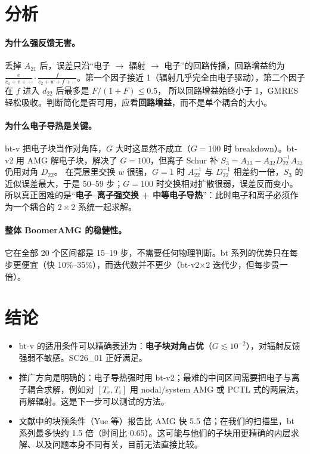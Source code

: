 \documentclass[11pt,a4paper]{ctexart}
\begin{document}
\section{分析}
\paragraph{为什么强反馈无害。}丢掉 $A_{21}$ 后，误差只沿“电子 $\to$ 辐射 $\to$ 电子”的回路传播，回路增益约为
$\frac{e}{c_1+e+\cdots}\cdot\frac{f}{c_2+w+f+\cdots}$。第一个因子接近 1（辐射几乎完全由电子驱动），第二个因子在 $f$ 进入 $d_{22}$ 后最多是 $F/(1+F)\le 0.5$，
所以回路增益始终小于 1，GMRES 轻松吸收。判断简化是否可用，应看\textbf{回路增益}，而不是单个耦合的大小。
\paragraph{为什么电子导热是关键。}bt-v 把电子块当作对角阵，$G$ 大时这显然不成立（$G=100$ 时 breakdown）。bt-v2 用 AMG 解电子块，解决了 $G=100$，但离子 Schur 补 $S_3=A_{33}-A_{32}D_{22}^{-1}A_{23}$ 仍用对角 $D_{22}$。
在壳层里交换 $w$ 很强，$G=1$ 时 $A_{22}^{-1}$ 与 $D_{22}^{-1}$ 相差约一倍，$S_3$ 的近似误差最大，于是 50--59 步；$G=100$ 时交换相对扩散很弱，误差反而变小。
所以真正困难的是“\textbf{电子--离子强交换 + 中等电子导热}”：此时电子和离子必须作为一个耦合的 $2\times2$ 系统一起求解。
\paragraph{整体 BoomerAMG 的稳健性。}它在全部 20 个区间都是 15--19 步，不需要任何物理判断。bt 系列的优势只在每步更便宜（快 10\%--35\%），而迭代数并不更少（bt-v2×2 迭代少，但每步贵一倍）。

\section{结论}
\begin{itemize}
\item bt-v 的适用条件可以精确表述为：\textbf{电子块对角占优}（$G\lesssim10^{-2}$），对辐射反馈强弱不敏感。SC26\_01 正好满足。
\item 推广方向是明确的：电子导热强时用 bt-v2；最难的中间区间需要把电子与离子耦合求解，例如对 $[T_e,T_i]$ 用 nodal/system AMG 或 PCTL 式的两层法，再解辐射。这是下一步可以测试的方法。
\item 文献中的块预条件（Yue 等）报告比 AMG 快 5.5 倍；在我们的扫描里，bt 系列最多快约 1.5 倍（时间比 0.65）。这可能与他们的子块用更精确的内层求解、以及问题本身不同有关，目前无法直接比较。
\end{itemize}
\end{document}
